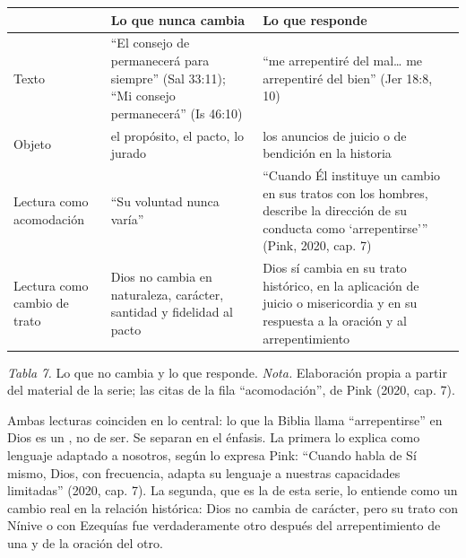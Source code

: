 \begin{center}\small\renewcommand{\arraystretch}{1.2}
\begin{tabular}{@{}L{2.4cm}L{5.6cm}L{5.8cm}@{}}
\toprule
 & \textbf{Lo que nunca cambia} & \textbf{Lo que responde} \\ \midrule
Texto & ``El consejo de \SENOR{} permanecerá para siempre'' (Sal 33:11); ``Mi consejo permanecerá'' (Is 46:10) & ``me arrepentiré del mal\ldots{} me arrepentiré del bien'' (Jer 18:8, 10) \\
Objeto & el propósito, el pacto, lo jurado & los anuncios de juicio o de bendición en la historia \\
Lectura como acomodación & ``Su voluntad nunca varía'' & ``Cuando Él instituye un cambio en sus tratos con los hombres, describe la dirección de su conducta como `arrepentirse'{}'' (Pink, 2020, cap. 7) \\
Lectura como cambio de trato & Dios no cambia en naturaleza, carácter, santidad y fidelidad al pacto & Dios sí cambia en su trato histórico, en la aplicación de juicio o misericordia y en su respuesta a la oración y al arrepentimiento \\
\bottomrule
\end{tabular}\par
{\footnotesize\color{gris}\textit{Tabla 7.} Lo que no cambia y lo que responde. \textit{Nota.} Elaboración propia a partir del material de la serie; las citas de la fila ``acomodación'', de Pink (2020, cap. 7).}
\end{center}

Ambas lecturas coinciden en lo central: lo que la Biblia llama ``arrepentirse'' en Dios es un , no de ser. Se separan en el énfasis. La primera lo explica como lenguaje adaptado a nosotros, según lo expresa Pink: ``Cuando habla de Sí mismo, Dios, con frecuencia, adapta su lenguaje a nuestras capacidades limitadas'' (2020, cap. 7). La segunda, que es la de esta serie, lo entiende como un cambio real en la relación histórica: Dios no cambia de carácter, pero su trato con Nínive o con Ezequías fue verdaderamente otro después del arrepentimiento de una y de la oración del otro.


